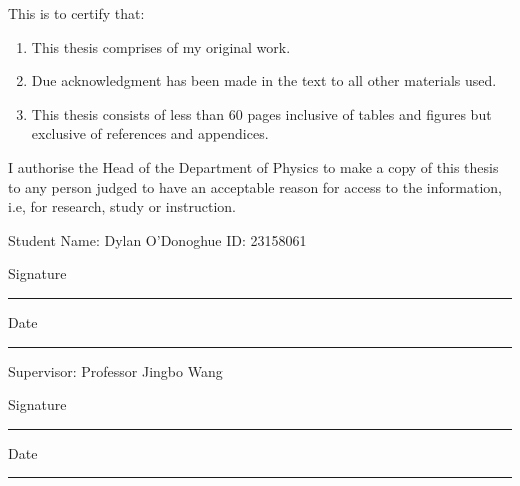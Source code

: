 This is to certify that:

\begin{enumerate}

    \item This thesis comprises of my original work.

    \item  Due acknowledgment has been made in the text to all other materials used.

    \item This thesis consists of less than 60 pages inclusive of tables and figures but exclusive of references and appendices.
\end{enumerate}

I authorise the Head of the Department of Physics to make a copy of this thesis to any person judged to have an acceptable reason for access to the information, i.e, for research, study or instruction.

Student Name: Dylan O'Donoghue \;\;\; ID: 23158061

Signature
\vspace{4mm}
\hrule

\vspace{5mm}
Date
\vspace{4mm}
\hrule

\vspace{10mm}
Supervisor: Professor Jingbo Wang

Signature
\vspace{4mm}
\hrule

\vspace{5mm}
Date
\vspace{4mm}
\hrule
